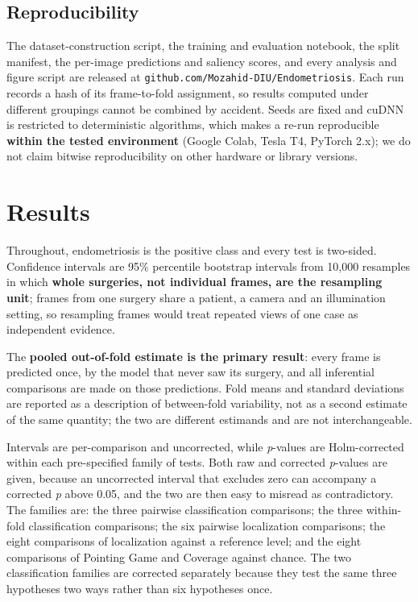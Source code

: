 \documentclass[preprint,12pt]{elsarticle}
\begin{document}
\subsection{Reproducibility}
\label{sec:reproducibility}

The dataset-construction script, the training and evaluation notebook, the split manifest, the per-image predictions and saliency scores, and every analysis and figure script are released at \texttt{github.com/Mozahid-DIU/Endometriosis}. Each run records a hash of its frame-to-fold assignment, so results computed under different groupings cannot be combined by accident. Seeds are fixed and cuDNN is restricted to deterministic algorithms, which makes a re-run reproducible \textbf{within the tested environment} (Google Colab, Tesla T4, PyTorch 2.x); we do not claim bitwise reproducibility on other hardware or library versions.

\section{Results}
\label{sec:results}

Throughout, endometriosis is the positive class and every test is two-sided. Confidence intervals are 95\% percentile bootstrap intervals from 10,000 resamples in which \textbf{whole surgeries, not individual frames, are the resampling unit}; frames from one surgery share a patient, a camera and an illumination setting, so resampling frames would treat repeated views of one case as independent evidence.

The \textbf{pooled out-of-fold estimate is the primary result}: every frame is predicted once, by the model that never saw its surgery, and all inferential comparisons are made on those predictions. Fold means and standard deviations are reported as a description of between-fold variability, not as a second estimate of the same quantity; the two are different estimands and are not interchangeable.

Intervals are per-comparison and uncorrected, while \emph{p}-values are Holm-corrected within each pre-specified family of tests. Both raw and corrected \emph{p}-values are given, because an uncorrected interval that excludes zero can accompany a corrected \emph{p} above 0.05, and the two are then easy to misread as contradictory. The families are: the three pairwise classification comparisons; the three within-fold classification comparisons; the six pairwise localization comparisons; the eight comparisons of localization against a reference level; and the eight comparisons of Pointing Game and Coverage against chance. The two classification families are corrected separately because they test the same three hypotheses two ways rather than six hypotheses once.
\end{document}
